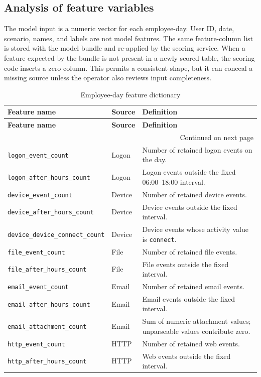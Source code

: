 \documentclass[12pt,a4paper,oneside]{report}
\newcommand{\code}[1]{\texttt{\small #1}}
\begin{document}
\subsection{Analysis of feature variables}
The model input is a numeric vector for each employee-day. User ID,
date, scenario, names, and labels are not model features. The same
feature-column list is stored with the model bundle and re-applied by
the scoring service. When a feature expected by the bundle is not
present in a newly scored table, the scoring code inserts a zero
column. This permits a consistent shape, but it can conceal a missing
source unless the operator also reviews input completeness.

\begin{longtable}{|p{}|p{}|p{}|}
\caption{Employee-day feature dictionary}\label{tab:feature-dictionary}\\
\hline
\textbf{Feature name} & \textbf{Source} & \textbf{Definition}\\\hline
\endfirsthead
\hline
\textbf{Feature name} & \textbf{Source} & \textbf{Definition}\\\hline
\endhead
\hline
\multicolumn{3}{r}{Continued on next page}\\
\endfoot
\hline
\endlastfoot
\code{logon\_event\_count} & Logon & Number of retained logon events on the day.\\\hline
\code{logon\_after\_hours\_count} & Logon & Logon events outside the fixed 06:00--18:00 interval.\\\hline
\code{device\_event\_count} & Device & Number of retained device events.\\\hline
\code{device\_after\_hours\_count} & Device & Device events outside the fixed interval.\\\hline
\code{device\_\allowbreak{}device\_\allowbreak{}connect\_\allowbreak{}count} & Device & Device events whose activity value is \code{connect}.\\\hline
\code{file\_event\_count} & File & Number of retained file events.\\\hline
\code{file\_after\_hours\_count} & File & File events outside the fixed interval.\\\hline
\code{email\_event\_count} & Email & Number of retained email events.\\\hline
\code{email\_after\_hours\_count} & Email & Email events outside the fixed interval.\\\hline
\code{email\_attachment\_count} & Email & Sum of numeric attachment values; unparseable values contribute zero.\\\hline
\code{http\_event\_count} & HTTP & Number of retained web events.\\\hline
\code{http\_after\_hours\_count} & HTTP & Web events outside the fixed interval.\\\hline
\end{longtable}
\end{document}
